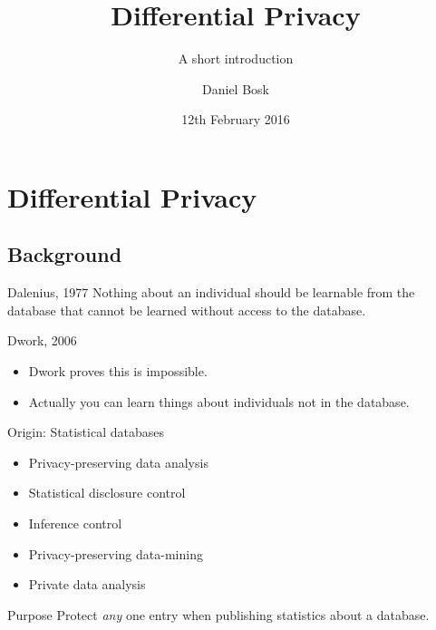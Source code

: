 \title{Differential Privacy}
\subtitle{A short introduction}
\author[D. Bosk <dbosk@kth.se>]{Daniel Bosk}
\date{12th February 2016}

\maketitle

\mode*

\begin{abstract}
  
\end{abstract}


\section{Differential Privacy}

\subsection{Background}

\begin{frame}
  \begin{block}{Dalenius, 1977}
    Nothing about an individual should be learnable from the database that 
    cannot be learned without access to the database.
  \end{block}

  \pause{}

  \begin{block}{Dwork, 2006}
    \begin{itemize}
      \item Dwork proves this is impossible.
      \item Actually you can learn things about individuals not in the 
        database.
    \end{itemize}
  \end{block}
\end{frame}

\begin{frame}
  \begin{block}{Origin: Statistical databases}
    \begin{itemize}
      \item Privacy-preserving data analysis
      \item Statistical disclosure control
      \item Inference control
      \item Privacy-preserving data-mining
      \item Private data analysis
    \end{itemize}
  \end{block}

  \pause{}

  \begin{block}{Purpose}
    Protect \emph{any} one entry when publishing statistics about a database.
  \end{block}
\end{frame}

